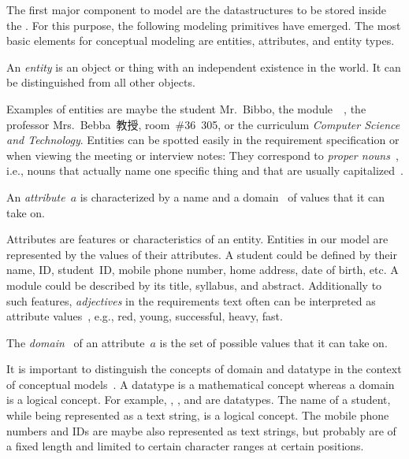 %
%
\label{sec:entitisAttrsErd}%
%
The first major component to model are the datastructures to be stored inside the \db.
For this purpose, the following modeling primitives have emerged.
The most basic elements for conceptual modeling are entities, attributes, and entity types.%
%
\begin{definition}[Entity]%
\label{def:entity}%
An \emph{entity} is an object or thing with an independent existence in the world. %
It can be distinguished from all other objects.%
\end{definition}%
%
Examples of entities are maybe the student Mr.~Bibbo, the module~~\cite{programmingWithPython}, the professor Mrs.~Bebba~教授, room~\#36~305, or the curriculum \emph{Computer Science and Technology}.
Entities can be spotted easily in the requirement specification or when viewing the meeting or interview notes:
They correspond to \emph{proper nouns}~\cite{C1997ECAED}, i.e., nouns that actually name one specific thing and that are usually capitalized~\cite{EOWM2025MWAMTD:CAPNWTDLWOGC}.%
%
\begin{definition}[Attribute]%
\label{def:attribute}%
An \emph{attribute}~$a$ is characterized by a name and a domain~ of values that it can take on.%
\end{definition}%
%
Attributes are features or characteristics of an entity.
Entities in our model are represented by the values of their attributes.
A student could be defined by their name, ID, student~ID, mobile phone number, home address, date of birth, etc.
A module could be described by its title, syllabus, and abstract.
Additionally to such features, \emph{adjectives} in the requirements text often can be interpreted as attribute values~\cite{C1997ECAED}, e.g., red, young, successful, heavy, fast.%
%
\begin{definition}[Domain]%
\label{def:attributeDomain}%
The \emph{domain}~ of an attribute~$a$ is the set of possible values that it can take on.%
\end{definition}%
%
It is important to distinguish the concepts of domain and datatype in the context of conceptual models~\cite{S2024D:LDMRMRA}.
A datatype is a mathematical concept whereas a domain is a logical concept.
For example, , , and  are datatypes.
The name of a student, while being represented as a text string, is a logical concept.
The mobile phone numbers and IDs are maybe also represented as text strings, but probably are of a fixed length and limited to certain character ranges at certain positions.
